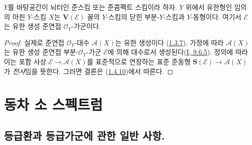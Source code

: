 \begin{proposition}[1.7.15]
\label{II.1.7.15-ko}
$Y$를 바탕공간이 뇌터인 준스킴 또는 준콤팩트 스킴이라 하자.
$Y$ 위에서 유한형인 임의의 아핀 $Y$-스킴 $X$는
$\mathbf{V}(\mathcal{E})$ 꼴의 $Y$-스킴의 닫힌 부분-$Y$-스킴과
$Y$-동형이다. 여기서 $\mathcal{E}$는 유한 생성 준연접
$\mathcal{O}_Y$-가군이다.
\end{proposition}

\begin{proof}
실제로 준연접 $\mathcal{O}_Y$-대수 $\mathcal{A}(X)$는 유한 생성이다
(\hyperref[II.1.3.7-ko]{1.3.7}). 가정에 따라 $\mathcal{A}(X)$는
유한 생성 준연접 부분-$\mathcal{O}_Y$-가군 $\mathcal{E}$에 의해
대수로서 생성된다(\hyperref[I.9.6.5-ko]{I, 9.6.5}). 정의에 따라
이는 포함 사상 $\mathcal{E}\to\mathcal{A}(X)$를 표준적으로 연장하는
표준 준동형 $\mathbf{S}(\mathcal{E})\to\mathcal{A}(X)$가
\emph{전사}임을 뜻한다. 그러면 결론은
(\hyperref[II.1.4.10-ko]{1.4.10})에서 따른다.
\end{proof}

\section{동차 소 스펙트럼}
\label{section:II.2-ko}

\subsection{등급환과 등급가군에 관한 일반 사항.}
\label{subsection:II.2.1-ko}

